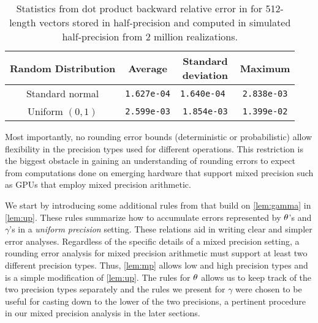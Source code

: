\begin{table}
	\centering
	\begin{tabular}{||c|c|c|c||} 
		\hline
		Random Distribution & Average & \makecell{Standard\\deviation}& Maximum\\ \hline
		Standard normal &{\tt 1.627e-04} & {\tt 1.640e-04 } & {\tt 2.838e-03}\\ \hline
		Uniform $(0,1)$ & {\tt 2.599e-03}& {\tt 1.854e-03} & {\tt 1.399e-02}\\ \hline
	\end{tabular}
	\caption{Statistics from dot product backward relative error in for 512-length vectors stored in half-precision and computed in simulated half-precision from 2 million realizations.}
	\label{table:HPdoterr}
\end{table}

Most importantly, no rounding error bounds (deterministic or probabilistic) allow flexibility in the precision types used for different operations. 
This restriction is the biggest obstacle in gaining an understanding of rounding errors to expect from computations done on emerging hardware that support mixed precision such as GPUs that employ mixed precision arithmetic.

We start by introducing some additional rules from \cite{Higham2002} that build on \cref{lem:gamma} in \cref{lem:up}. 
These rules summarize how to accumulate errors represented by $\theta$'s and $\gamma$'s in a \emph{uniform precision} setting.
These relations aid in writing clear and simpler error analyses.
Regardless of the specific details of a mixed precision setting, a rounding error analysis for mixed precision arithmetic must support at least two different precision types. 
Thus, \cref{lem:mp} allows low and high precision types and is a simple modification of \cref{lem:up}.
The rules for $\theta$ allows us to keep track of the two precision types separately and the rules we present for $\gamma$ were chosen to be useful for casting down to the lower of the two precisions, a pertinent procedure in our mixed precision analysis in the later sections. 


